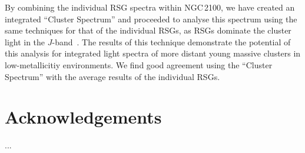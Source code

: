 \documentclass[useAMS,usenatbib]{mn2e}
\begin{document}
By combining the individual RSG spectra within NGC\,2100, we have created an integrated ``Cluster Spectrum'' and proceeded to analyse this spectrum using the same techniques for that of the individual RSGs, as RSGs dominate the cluster light in the $J$-band~\citep{2013MNRAS.430L..35G}.
The results of this technique demonstrate the potential of this analysis for integrated light spectra of more distant young massive clusters in low-metallicitiy environments.
We find good agreement using the ``Cluster Spectrum'' with the average results of the individual RSGs.



\section*{Acknowledgements}

...

% 
\end{document}

